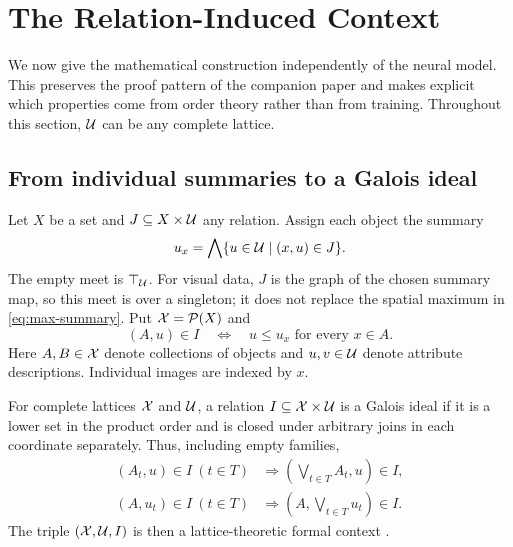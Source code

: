 \section{The Relation-Induced Context}
\label{sec:contexts}
We now give the mathematical construction independently of the neural
model. This preserves the proof pattern of the companion paper and
makes explicit which properties come from order theory rather than from
training. Throughout this section, $\mathcal{U}$ can be any complete lattice.

\subsection{From individual summaries to a Galois ideal}
\label{sub:galois-ideal}
Let $X$ be a set and $J\subseteq X\times\mathcal{U}$ any relation. Assign each
object the summary
\begin{equation}\label{eq:relation-summary}
      u_{x}=\bigwedge\{u\in\mathcal{U}\mid(x,u)\in J\}.
\end{equation}
The empty meet is $\top_{\mathcal{U}}$. For visual data, $J$ is the graph of the
chosen summary map, so this meet is over a singleton; it does not replace
the spatial maximum in \cref{eq:max-summary}. Put $\mathcal{X}=\mathcal{P}(X)$ and
\begin{equation}\label{eq:incidence}
      (A,u)\in I\quad\Longleftrightarrow\quad
      u\leq u_{x}\text{ for every }x\in A.
\end{equation}
Here $A,B\in\mathcal{X}$ denote collections of objects and $u,v\in\mathcal{U}$ denote
attribute descriptions. Individual images are indexed by $x$.

\begin{definition}
      \label{def:galois-ideal}
      For complete lattices $\mathcal{X}$ and $\mathcal{U}$, a relation
      $I\subseteq\mathcal{X}\times\mathcal{U}$ is a Galois ideal if it is a lower set in the
      product order and is closed under arbitrary joins in each coordinate
      separately. Thus, including empty families,
      \begin{equation}\label{eq:ideal-joins}
            \begin{aligned}
                  (A_{t},u)\in I\ (t\in T) & \Longrightarrow
                  (\bigvee_{t\in T}A_{t},u)\in I,            \\
                  (A,u_{t})\in I\ (t\in T) & \Longrightarrow
                  (A,\bigvee_{t\in T}u_{t})\in I.
            \end{aligned}
      \end{equation}
      The triple $(\mathcal{X},\mathcal{U},I)$ is then a lattice-theoretic formal context
      \cite{FCA_Latt_Theor}.
\end{definition}

